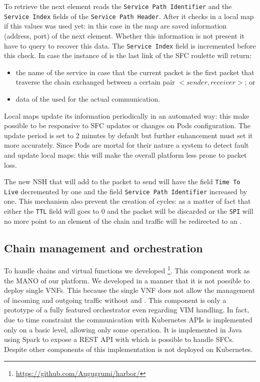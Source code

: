 To retrieve the next element \astaire{} reads the \texttt{Service Path
Identifier} and the \texttt{Service Index} fields of the \texttt{Service Path
Header}. After it checks in a local map if this values was used yet: in this
case in the map are saved information (address, port) of the next element.
Whether this information is not present it have to query \roulette{} to recover
this data. The \texttt{Service Index} field is incremented before this check. In
case the instance of \astaire{} is the last link of the SFC roulette will
return:
\begin{itemize}
  \item the name of the \egress{} service in case that the current packet is the
  first packet that traverse the chain exchanged between a certain pair
  $<sender,receiver>$; or
  \item data of the \egress{} used for the actual communication.
\end{itemize}
Local maps update its information periodically in an automated way: this make
possible to be responsive to SFC updates or changes on Pods configuration. The
update period is set to 2 minutes by default but further enhancement must set it
more accurately. Since Pods are mortal for their nature a system to detect fault
and update local maps: this will make the overall platform less prone to packet
loss.

The new NSH that \astaire{} will add to the packet to send will have the field
\texttt{Time To Live} decremented by one and the field \texttt{Service Path
Identifier} increased by one. This mechanism also prevent the creation of
cycles: as a matter of fact that either the \texttt{TTL} field will goes to $0$
and the packet will be discarded or the \texttt{SPI} will no more point to an
element of the chain and traffic will be redirected to an \egress{}.

\subsection{Chain management and orchestration}
To handle chains and virtual functions we developed
\harbor{}\footnote{\url{https://github.com/Augugrumi/harbor/}}. This component
work as the MANO of our platform. We developed \harbor{} in a manner that it
is not possible to deploy single VNFs. This because the single VNF does not
allow the management of incoming and outgoing traffic without \ingresses{} and
\egresses{}. This component is only a prototype of a fully featured orchestrator
even regarding VIM handling. In fact, due to time constraint the communication
with Kubernetes APIs is implemented only on a basic level, allowing only some
operation. It is implemented in Java using Spark to expose a REST API with which
is possible to handle SFCs. Despite other components of this implementation 
\harbor{} is not deployed on Kubernetes.

